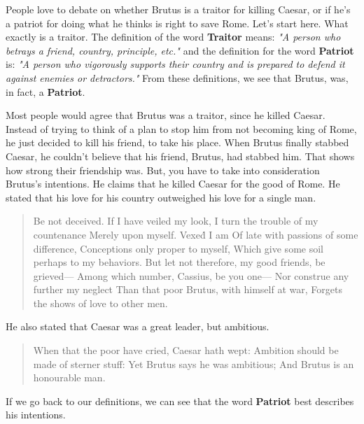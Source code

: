 People love to debate on whether Brutus is a traitor for killing Caesar, or if
he's a patriot for doing what he thinks is right to save Rome. Let's start here.
What exactly is a traitor. The definition of the word \textbf{Traitor} means:
\textit{"A person who betrays a friend, country, principle, etc."} and the
definition for the word \textbf{Patriot} is: \textit{"A person who vigorously
supports their country and is prepared to defend it against enemies or
detractors."} From these definitions, we see that Brutus, was, in fact, a
\textbf{Patriot}.

Most people would agree that Brutus was a traitor, since he killed Caesar.
Instead of trying to think of a plan to stop him from not becoming king of Rome,
he just decided to kill his friend, to take his place. When Brutus finally
stabbed Caesar, he couldn't believe that his friend, Brutus, had stabbed him.
That shows how strong their friendship was. But, you have to take into
consideration Brutus's intentions. He claims that he killed Caesar for the good
of Rome. He stated that his love for his country outweighed his love for a
single man.

\begin{center}
  \begin{quotation}
    Be not deceived. If I have veiled my look, I turn the trouble of my
    countenance Merely upon myself. Vexe\'d I am Of late with passions of some
    difference, Conceptions only proper to myself, Which give some soil perhaps
    to my behaviors. But let not therefore, my good friends, be grieved— Among
    which number, Cassius, be you one— Nor construe any further my neglect Than
    that poor Brutus, with himself at war, Forgets the shows of love to other
    men.
  \end{quotation}
\end{center}

He also stated that Caesar was a great leader, but ambitious.

\begin{center}
  \begin{quotation}
    When that the poor have cried, Caesar hath wept: Ambition should be made of
    sterner stuff: Yet Brutus says he was ambitious; And Brutus is an honourable
    man.
  \end{quotation}
\end{center}

\noindent If we go back to our definitions, we can see that the word
\textbf{Patriot} best describes his intentions.

